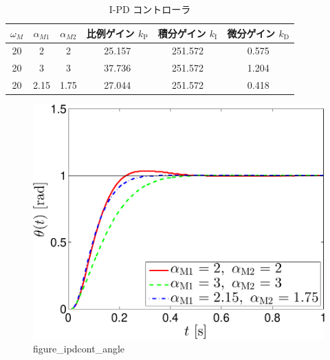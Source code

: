 \begin{table}[H]
  \centering
  \caption{I-PD コントローラ}
  \begin{tabular}{|c|c|c|c|c|c|}
    \hline
    $\omega_M$ & $\alpha_{M1}$ & $\alpha_{M2}$ & 比例ゲイン $k_{\mathrm{P}}$ & 積分ゲイン $k_{\mathrm{I}}$ & 微分ゲイン $k_{\mathrm{D}}$ \\ \hline
    20         & 2             & 2             & 25.157                      & 251.572                     & 0.575                       \\ \hline
    20         & 3             & 3             & 37.736                      & 251.572                     & 1.204                       \\ \hline
    20         & 2.15          & 1.75          & 27.044                      & 251.572                     & 0.418                       \\ \hline
  \end{tabular}
\end{table}


\begin{figure}[h]
  \centering
  \includegraphics[scale=0.5]{sozai/figure_ipdcont_angle-crop.pdf}
  \caption{figure\_ipdcont\_angle}
\end{figure}


